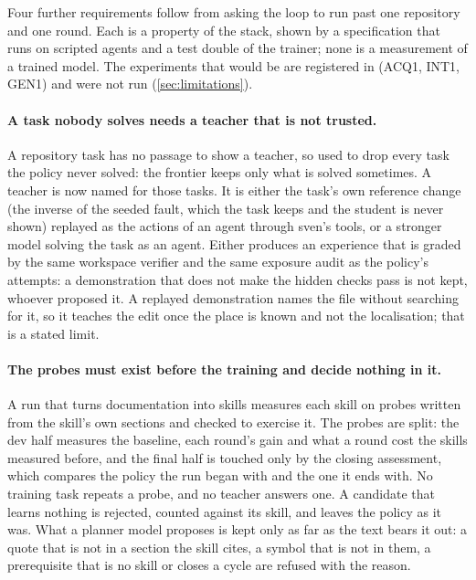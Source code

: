Four further requirements follow from asking the loop to run past one repository and one
round. Each is a property of the stack, shown by a specification that runs on scripted agents
and a test double of the trainer; none is a measurement of a trained model. The experiments
that would be are registered in  (ACQ1, INT1, GEN1) and were
not run (\cref{sec:limitations}).

\paragraph{A task nobody solves needs a teacher that is not trusted.} A repository task has no
passage to show a teacher, so  used to drop every task the policy never solved:
the frontier keeps only what is solved sometimes. A teacher is now named for those tasks. It is
either the task's own reference change (the inverse of the seeded fault, which the task keeps
and the student is never shown) replayed as the actions of an agent through sven's tools, or a
stronger model solving the task as an agent. Either produces an experience that is graded by the
same workspace verifier and the same exposure audit as the policy's attempts: a demonstration
that does not make the hidden checks pass is not kept, whoever proposed it. A
replayed demonstration names the file without searching for it, so it teaches the edit once the
place is known and not the localisation; that is a stated limit.

\paragraph{The probes must exist before the training and decide nothing in it.} A run that
turns documentation into skills measures each skill on probes written from the skill's own
sections and checked to exercise it. The probes are split: the dev half measures the baseline,
each round's gain and what a round cost the skills measured before, and the final half is
touched only by the closing assessment, which compares the policy the run began with and the one
it ends with. No training task repeats a probe, and no teacher answers one. A
candidate that learns nothing is rejected, counted against its skill, and leaves the policy as it
was. What a planner model proposes is kept only as far as the text bears it out: a quote
that is not in a section the skill cites, a symbol that is not in them, a prerequisite that is
no skill or closes a cycle are refused with the reason.

